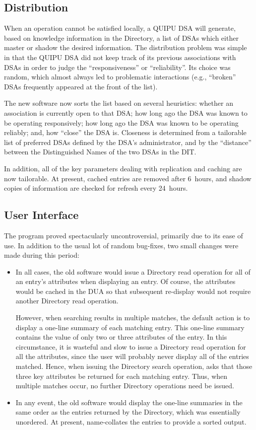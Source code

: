 \subsection	{Distribution}
When an operation cannot be satisfied locally,
a QUIPU DSA will generate,
based on knowledge information in the Directory,
a list of DSAs which either master or shadow the desired information.
The distribution problem was simple in that the QUIPU DSA did not
keep track of its previous associations with DSAs in order to judge the
``responsiveness'' or ``reliability''.
Its choice was random,
which almost always led to problematic interactions
(e.g., ``broken'' DSAs frequently appeared at the front of the list).

The new software now sorts the list based on several heuristics:
whether an association is currently open to that DSA;
how long ago the DSA was known to be operating responsively;
how long ago the DSA was known to be operating reliably;
and,
how ``close'' the DSA is.
Closeness is determined from a tailorable list of preferred DSAs defined by
the DSA's administrator,
and by the ``distance'' between the Distinguished Names of the two DSAs in the
DIT.

In addition,
all of the key parameters dealing with replication and caching are now
tailorable.
At present,
cached entries are removed after 6~hours,
and shadow copies of information are checked for refresh every 24~hours.

\subsection	{User Interface}
The  program proved spectacularly uncontroversial,
primarily due to its ease of use.
In addition to the usual lot of random bug-fixes,
two small changes were made during this period:
\begin{itemize}
\item	In all cases,
	the old software would issue a Directory read operation for all of an
	entry's attributes when displaying an entry.
	Of course,
	the attributes would be cached in the DUA so that subsequent re-display
	would not require another Directory read operation.

	However,
	when searching results in multiple matches,
	the default action is to display a one-line summary of each matching
	entry.
	This one-line summary contains the value of only two or three
	attributes of the entry.
	In this circumstance,
	it is wasteful and slow to issue a Directory read operation for all
	the attributes,
	since the user will probably never display all of the entries matched.
	Hence, when issuing the Directory search operation,
	 asks that those three key attributes be returned for each
	matching entry.
	Thus,
	when multiple matches occur,
	no further Directory operations need be issued.

\item	In any event,
	the old software would display the one-line summaries in the same
	order as the entries returned by the Directory,
	which was essentially unordered.
	At present,
	 name-collates the entries to provide a sorted output.
\end{itemize}

